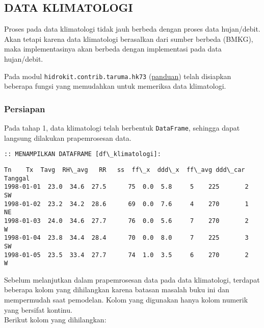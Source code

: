 \documentclass[11pt]{article}
\makeatletter
\newcommand{\boxspacing}{\kern\kvtcb@left@rule\kern\kvtcb@boxsep}
\newcommand{\prompt}[4]{
        \ttfamily\llap{{\color{#2}[#3]:\hspace{3pt}#4}}\vspace{-\baselineskip}
    }
\makeatother
\begin{document}
    \hypertarget{data-klimatologi}{%
\subsection{DATA KLIMATOLOGI}\label{data-klimatologi}}

Proses pada data klimatologi tidak jauh berbeda dengan proses data
hujan/debit. Akan tetapi karena data klimatologi berasalkan dari sumber
berbeda (BMKG), maka implementasinya akan berbeda dengan implementasi
pada data hujan/debit.

Pada modul \texttt{hidrokit.contrib.taruma.hk73}
(\href{https://nbviewer.jupyter.org/gist/taruma/b00880905f297013f046dad95dc2e284}{panduan})
telah disiapkan beberapa fungsi yang memudahkan untuk memeriksa data
klimatologi.

    \hypertarget{persiapan}{%
\subsubsection{Persiapan}\label{persiapan}}

Pada tahap 1, data klimatologi telah berbentuk \texttt{DataFrame},
sehingga dapat langsung dilakukan prapemrosesan data.

    \begin{Verbatim}[commandchars=\\\{\}]
:: MENAMPILKAN DATAFRAME [df\_klimatologi]:
    \end{Verbatim}

            \begin{tcolorbox}[breakable, size=fbox, boxrule=.5pt, pad at break*=1mm, opacityfill=0]
\prompt{Out}{outcolor}{0}{\boxspacing}
\begin{Verbatim}[commandchars=\\\{\}]
              Tn    Tx  Tavg  RH\_avg   RR   ss  ff\_x  ddd\_x  ff\_avg ddd\_car
Tanggal
1998-01-01  23.0  34.6  27.5      75  0.0  5.8     5    225       2      SW
1998-01-02  23.2  34.2  28.6      69  0.0  7.6     4    270       1      NE
1998-01-03  24.0  34.6  27.7      76  0.0  5.6     7    270       2      W
1998-01-04  23.8  34.4  28.4      70  0.0  8.0     7    225       3      SW
1998-01-05  23.5  33.4  27.7      74  1.0  3.5     6    270       2      W
\end{Verbatim}
\end{tcolorbox}
        
    Sebelum melanjutkan dalam prapemrosesan data pada data klimatologi,
terdapat beberapa kolom yang dihilangkan karena batasan masalah buku ini
dan mempermudah saat pemodelan. Kolom yang digunakan hanya kolom numerik
yang bersifat kontinu.\\
Berikut kolom yang dihilangkan:
\end{document}
